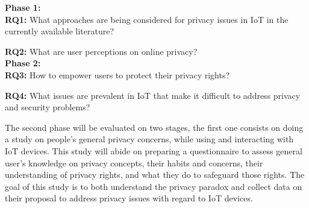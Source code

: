 \vspace{5mm}
\textbf{Phase 1:} \\

\textbf{RQ1:} What approaches are being considered for privacy issues in
IoT in the currently available literature?

\textbf{RQ2:} What are user perceptions on online privacy? \\

\textbf{Phase 2:} \\

\textbf{RQ3:}
How to empower users to protect their privacy rights?

\textbf{RQ4:} What issues are prevalent in IoT that make it difficult to
address privacy and security problems?
\vspace{5mm}

The second phase will be evaluated on two stages, the first one consists
on doing a study on people's general privacy concerns, while using and interacting
with IoT devices. This study will abide on preparing a questionnaire to
assess general user's knowledge on privacy concepts, their habits and concerns,
their understanding of privacy rights, and what they do to safeguard those
rights. The goal of this study is to both understand the privacy paradox
and collect data on their proposal to address privacy issues with regard
to IoT devices.






